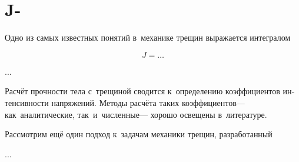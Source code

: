 \section{J-}






\begin{otherlanguage}{russian}

Одно из самых известных понятий в~механике трещин выражается интегралом

\nopagebreak\vspace{-0.2em}\begin{equation}
J = \ldots
\end{equation}

...



\end{otherlanguage}



\begin{otherlanguage}{russian}

Расчёт прочности тела с~трещиной сводится к~определению коэффициентов интенсивности напряжений.
Методы расчёта таких коэффициентов\:---
как~аналитические, так~и~численные\:---
хорошо освещены в~литературе.

Рассмотрим ещё один подход к~задачам механики трещин, разработанный

...



\end{otherlanguage}

